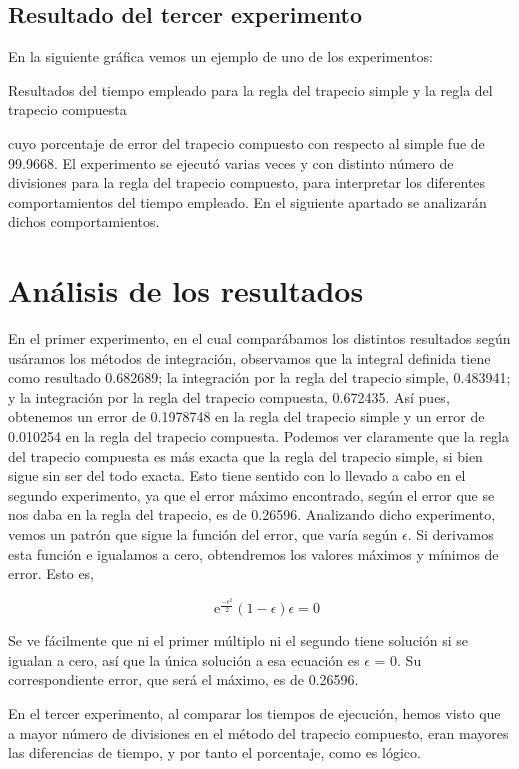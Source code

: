 \subsection{Resultado del tercer experimento}

En la siguiente gráfica vemos un ejemplo de uno de los experimentos:

Resultados del tiempo empleado para la regla del trapecio simple y la regla del trapecio compuesta


cuyo porcentaje de error del trapecio compuesto con respecto al simple fue de 99.9668.
El experimento se ejecutó varias veces y con distinto número de divisiones para la regla del trapecio compuesto,
para interpretar los diferentes comportamientos del tiempo empleado. En el siguiente apartado se analizarán dichos comportamientos.


\section{Análisis de los resultados}
\label{3:sec:4}

 En el primer experimento, en el cual comparábamos los distintos resultados según usáramos los métodos de integración,
observamos que la integral definida tiene como resultado 0.682689; la integración por la regla del trapecio simple, 0.483941;
y la integración por la regla del trapecio compuesta, 0.672435.
Así pues, obtenemos un error de 0.1978748 en la regla del trapecio simple y un error de 0.010254 en la regla del trapecio compuesta.
Podemos ver claramente que la regla del trapecio compuesta es más exacta que la regla del trapecio simple, si bien sigue sin ser del todo exacta.
Esto tiene sentido con lo llevado a cabo en el segundo experimento, ya que el error máximo encontrado, según el error que se nos daba en la regla del trapecio,
es de 0.26596. Analizando dicho experimento, vemos un patrón que sigue la función del error, que varía según $\epsilon$.
Si derivamos esta función e igualamos a cero, obtendremos los valores máximos y mínimos de error. Esto es,

\[
\quad\text{e}^{\frac{-\epsilon^2}{2}} \displaystyle (1-\epsilon) \displaystyle \epsilon = 0
\]

Se ve fácilmente que ni el primer múltiplo ni el segundo tiene solución si se igualan a cero, así que la única solución a esa ecuación es $\epsilon$ = 0.
Su correspondiente error, que será el máximo, es de 0.26596.

En el tercer experimento, al comparar los tiempos de ejecución, hemos visto que a mayor número de divisiones en el método del trapecio compuesto, eran mayores las diferencias
de tiempo, y por tanto el porcentaje, como es lógico. 

